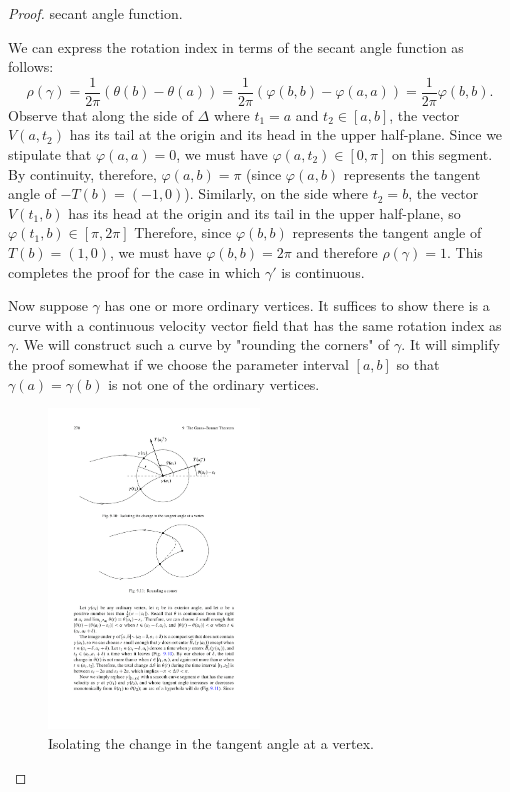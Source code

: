 \begin{proof}
secant angle function.\par
We can express the rotation index in terms of the secant angle function as follows:
\[\rho(\gamma)=\frac{1}{2\pi}(\theta(b)-\theta(a))=\frac{1}{2\pi}(\varphi(b,b)-\varphi(a,a))=\frac{1}{2\pi}\varphi(b,b).\]
Observe that along the side of $\Delta$ where $t_1=a$ and $t_2\in[a,b]$, the vector $V(a,t_2)$ has its tail at the origin and its head in the upper half-plane. Since we stipulate that $\varphi(a,a)=0$, we must have $\varphi(a,t_2)\in[0,\pi]$ on this segment. By continuity, therefore, $\varphi(a,b)=\pi$ (since $\varphi(a,b)$ represents the tangent angle of $-T(b)=(-1,0)$). Similarly, on the side where $t_2=b$, the vector $V(t_1,b)$ has its head at the origin and its tail in the upper half-plane, so $\varphi(t_1,b)\in[\pi,2\pi]$ Therefore, since $\varphi(b,b)$ represents the tangent angle of $T(b)=(1,0)$, we must have $\varphi(b,b)=2\pi$ and therefore $\rho(\gamma)=1$. This completes the proof for the case in which $\gamma'$ is continuous.\par
Now suppose $\gamma$ has one or more ordinary vertices. It suffices to show there is a curve with a continuous velocity vector field that has the same rotation index as $\gamma$. We will construct such a curve by "rounding the corners" of $\gamma$. It will simplify the proof somewhat if we choose the parameter interval $[a,b]$ so that $\gamma(a)=\gamma(b)$ is not one of the ordinary vertices.
\begin{figure}[H]
\centering
\includegraphics[width=0.5\textwidth]{pictures/isolating-corner}
\caption{Isolating the change in the tangent angle at a vertex.}
\end{figure}


\end{proof}
